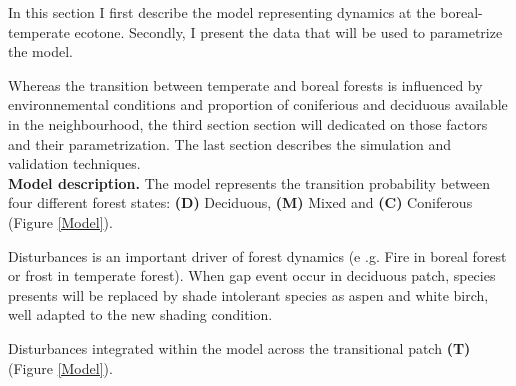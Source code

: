 In this section I first describe the  model representing dynamics at the
boreal-temperate ecotone. Secondly, I present the  data that will be used to
parametrize the model.


Whereas the transition between temperate and boreal forests is influenced by
environnemental conditions and proportion of coniferious and deciduous
available in the neighbourhood, the third section section will dedicated on
those factors and their parametrization. The last section describes the
simulation and validation techniques.\\




\textbf{Model description.} The model represents the transition probability
between four different forest states: \textbf{(D)} Deciduous, \textbf{(M)}
Mixed and \textbf{(C)} Coniferous (Figure \ref{Model}).


Disturbances is an important driver of forest dynamics (e .g. Fire in boreal
forest or frost in temperate forest). When gap event occur in deciduous patch,
species presents will be replaced by shade intolerant species as aspen and
white birch, well adapted to the new shading condition.


Disturbances  integrated within the model across the transitional patch
\textbf{(T)} (Figure \ref{Model}).


